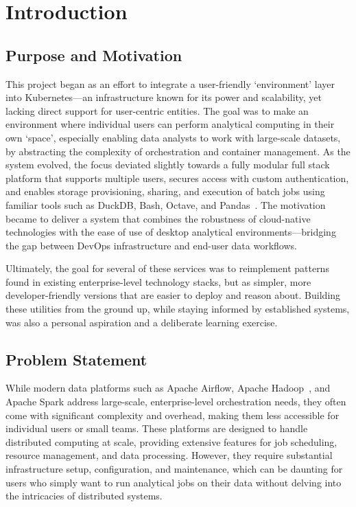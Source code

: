 \chapter{Introduction}
\label{Chapter-Introduction}

\section{Purpose and Motivation}
\hspace{2mm}This project began as an effort to integrate a user-friendly `environment' layer into Kubernetes—an infrastructure known 
for its power and scalability, yet lacking direct support for user-centric entities. The goal was to make 
an environment where individual users can perform analytical computing in their own `space', especially enabling
data analysts to work with large-scale datasets, by abstracting the complexity of orchestration and container management.
As the system evolved, the focus deviated slightly towards a fully modular full stack platform that supports multiple users, secures
access with custom authentication, and enables storage provisioning, sharing, and execution of batch jobs using familiar tools such
as DuckDB, Bash, Octave, and Pandas~\cite{mckinney-proc-scipy-2010}. The motivation became to deliver a system 
that combines the robustness of cloud-native
technologies with the ease of use of desktop analytical environments—bridging the gap between DevOps infrastructure and 
end-user data workflows.

Ultimately, the goal for several of these services was to reimplement patterns found in existing enterprise-level
technology stacks, but as simpler, more developer-friendly versions that are easier to deploy and reason about.
Building these utilities from the ground up, while staying informed by established systems, was also a personal
aspiration and a deliberate learning exercise.

\newpage

\section{Problem Statement}

\hspace{2mm}While modern data platforms such as Apache Airflow, Apache Hadoop~\cite{hadoop}, and Apache Spark 
address large-scale, enterprise-level orchestration needs, they often come with significant complexity and overhead,
making them less accessible for individual users or small teams. These platforms are designed to handle distributed computing
at scale, providing extensive features for job scheduling, resource management, and data processing. However, they require
substantial infrastructure setup, configuration, and maintenance, which can be daunting for users who simply want to run
analytical jobs on their data without delving into the intricacies of distributed systems.

